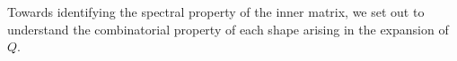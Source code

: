 \documentclass[12pt]{article}
\begin{document}
Towards identifying the spectral property of the inner matrix, we set out to understand the combinatorial property of each shape arising in the expansion of $Q$. 

\end{document}
